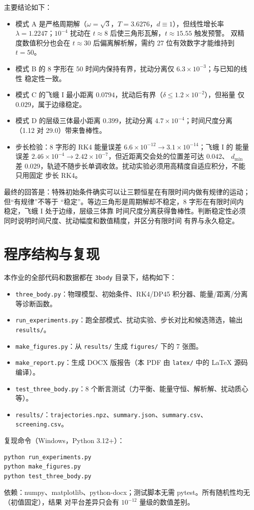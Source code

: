 \documentclass[UTF8,fontset=windows,11pt,a4paper]{ctexart}
\begin{document}
主要结论如下：
\begin{itemize}[leftmargin=2em,itemsep=2pt]
\item 模式 A 是严格周期解（$\omega=\sqrt3$，$T=3.6276$，$d\equiv1$），但线性增长率
$\lambda=1.2247$；$10^{-4}$ 扰动在 $t\approx8$ 后使三角形瓦解，$t\approx15.55$ 触发预警。
双精度数值积分也会在 $t\approx30$ 后偏离解析解，需约 27 位有效数字才能维持到 $t=50$。
\item 模式 B 的 8 字形在 50 时间内保持有界，扰动分离仅 $6.3\times10^{-3}$；与已知的线性
稳定性一致。
\item 模式 C 的飞蛾 I 最小距离 $0.0794$，扰动后有界（$\delta\le1.2\times10^{-2}$），但裕量
仅 $0.029$，属于边缘稳定。
\item 模式 D 的层级三体最小距离 $0.399$，扰动分离 $4.7\times10^{-4}$；时间尺度分离
（1.12 对 29.0）带来鲁棒性。
\item 步长检验：8 字形的 RK4 能量误差 $6.6\times10^{-12}\to3.1\times10^{-14}$；飞蛾 I 的
能量误差 $2.46\times10^{-4}\to2.42\times10^{-7}$，但近距离交会处的位置差可达 $0.042$、
$d_{\min}$ 差 $0.029$，轨迹不随步长单调收敛。扰动实验必须用高精度自适应积分，不能只用固定
步长 RK4。
\end{itemize}
最终的回答是：特殊初始条件确实可以让三颗恒星在有限时间内做有规律的运动；但“有规律”不等于
“稳定”。等边三角形是周期解却不稳定，8 字形在有限时间内稳定，飞蛾 I 处于边缘，层级三体靠
时间尺度分离获得鲁棒性。判断稳定性必须同时说明时间尺度、扰动幅度和数值精度，并区分有限时间
有界与永久稳定。

\appendix
\section{程序结构与复现}\label{app:code}
本作业的全部代码和数据都在 \texttt{3body} 目录下，结构如下：
\begin{itemize}[leftmargin=2em,itemsep=1pt]
\item \texttt{three\_body.py}：物理模型、初始条件、RK4/DP45 积分器、能量/距离/分离等诊断函数。
\item \texttt{run\_experiments.py}：跑全部模式、扰动实验、步长对比和候选筛选，输出 \texttt{results/}。
\item \texttt{make\_figures.py}：从 \texttt{results/} 生成 \texttt{figures/} 下的 7 张图。
\item \texttt{make\_report.py}：生成 DOCX 版报告（本 PDF 由 \texttt{latex/} 中的 \LaTeX{} 源码编译）。
\item \texttt{test\_three\_body.py}：8 个断言测试（力平衡、能量守恒、解析解、扰动质心等）。
\item \texttt{results/}：\texttt{trajectories.npz}、\texttt{summary.json}、\texttt{summary.csv}、
\texttt{screening.csv}。
\end{itemize}
复现命令（Windows，Python 3.12+）：
\begin{lstlisting}[language=bash,numbers=none]
python run_experiments.py
python make_figures.py
python test_three_body.py
\end{lstlisting}
依赖：numpy、matplotlib、python-docx；测试脚本无需 pytest。所有随机性均无（初值固定），结果
对平台差异只会有 $10^{-12}$ 量级的数值差别。
\end{document}
